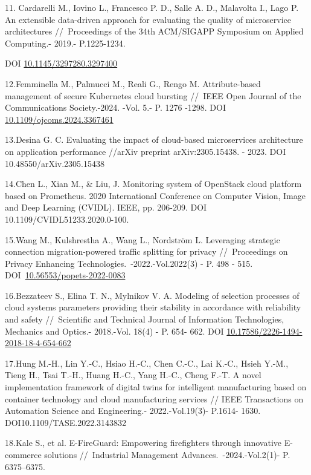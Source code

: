 \begin{references}
11. Cardarelli M., Iovino L., Francesco P. D., Salle A. D., Malavolta
I., Lago P. An extensible data-driven approach for evaluating the
quality of microservice architectures //~Proceedings of the 34th
ACM/SIGAPP Symposium on Applied Computing.- 2019.- P.1225-1234.

DOI
\href{https://doi.org/10.1145/3297280.3297400}{10.1145/3297280.3297400}

12.Femminella M., Palmucci M., Reali G., Rengo M. Attribute-based
management of secure Kubernetes cloud bursting //~IEEE Open Journal of
the Communications Society.-2024. -Vol. 5.- P. 1276 -1298. DOI
\href{https://doi.org/10.1109/ojcoms.2024.3367461}{10.1109/ojcoms.2024.3367461}

13.Desina G. C. Evaluating the impact of cloud-based microservices
architecture on application performance //arXiv preprint
arXiv:2305.15438. - 2023. DOI 10.48550/arXiv.2305.15438

14.Chen L., Xian M., \& Liu, J. Monitoring system of OpenStack cloud
platform based on Prometheus. 2020 International Conference on Computer
Vision, Image and Deep Learning (CVIDL). IEEE, pp. 206-209. DOI
10.1109/CVIDL51233.2020.0-100.

15.Wang M., Kulshrestha A., Wang L., Nordström L. Leveraging strategic
connection migration-powered traffic splitting for privacy
//~Proceedings on Privacy Enhancing Technologies.~-2022.-Vol.2022(3) -
P. 498 - 515.
DOI~\href{https://doi.org/10.56553/popets-2022-0083}{10.56553/popets-2022-0083}

16.Bezzateev S., Elina T. N., Mylnikov V. A. Modeling of selection
processes of cloud systems parameters providing their stability in
accordance with reliability and safety //~Scientific and Technical
Journal of Information Technologies, Mechanics and Optics.- 2018.-Vol.
18(4) - P. 654- 662. DOI
\href{https://doi.org/10.17586/2226-1494-2018-18-4-654-662}{10.17586/2226-1494-2018-18-4-654-662}

17.Hung M.-H., Lin Y.-C., Hsiao H.-C., Chen C.-C., Lai K.-C., Hsieh
Y.-M., Tieng H., Tsai T.-H., Huang H.-C., Yang H.-C., Cheng F.-T. A
novel implementation framework of digital twins for intelligent
manufacturing based on container technology and cloud manufacturing
services // IEEE Transactions on Automation Science and Engineering.-
2022.-Vol.19(3)- P.1614- 1630. DOI10.1109/TASE.2022.3143832

18.Kale S., et al. E-FireGuard: Empowering firefighters through
innovative E-commerce solutions //~Industrial Management
Advances.~-2024.-Vol.2(1)- P. 6375--6375.


\end{references}
